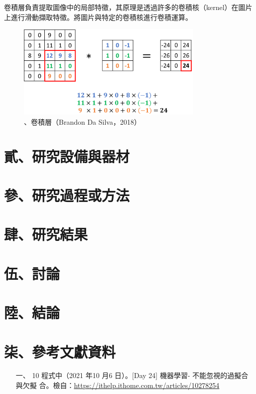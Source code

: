 \begin{itemize}
\begin{itemize}
\begin{itemize}
            卷積層負責提取圖像中的局部特徵，其原理是透過許多的卷積核（kernel）在圖片上進行滑動擷取特徵。將圖片與特定的卷積核進行卷積運算。

            \begin{figure}[H]
                \centering
                \includegraphics[width = 9cm]{picture/卷積層.jpg}
                \caption{、卷積層（Brandon Da Silva，2018）}
                \label{卷積層}
            \end{figure}
        \end{itemize}
    \end{itemize}
\end{itemize}

\section{貳、研究設備與器材}

\section{參、研究過程或方法}

\section{肆、研究結果}

\section{伍、討論}

\section{陸、結論}

\section{柒、參考文獻資料}
\begin{itemize}
    \item [一、] 10 程式中（2021 年10 月6 日）。[Day 24] 機器學習- 不能忽視的過擬合與欠擬
    合。檢自：\url{https://ithelp.ithome.com.tw/articles/10278254}
\end{itemize}